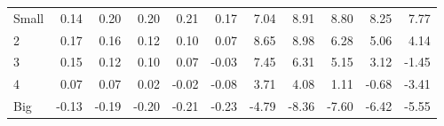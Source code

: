 \begin{table}[!ht]
\begin{tabular}{lrrrrrrrrrr}
    \\
      \cmidrule(r){2-6} \cmidrule(r){7-11}

    Small   & 0.14  & 0.20  & 0.20  & 0.21  & 0.17  & 7.04  & 8.91  & 8.80  & 8.25  & 7.77  \\
         2  & 0.17  & 0.16  & 0.12  & 0.10  & 0.07  & 8.65  & 8.98  & 6.28  & 5.06  & 4.14  \\
         3  & 0.15  & 0.12  & 0.10  & 0.07  & -0.03  & 7.45  & 6.31  & 5.15  & 3.12  & -1.45  \\
         4  & 0.07  & 0.07  & 0.02  & -0.02  & -0.08  & 3.71  & 4.08  & 1.11  & -0.68  & -3.41  \\
    Big     & -0.13  & -0.19  & -0.20  & -0.21  & -0.23  & -4.79  & -8.36  & -7.60  & -6.42  & -5.55  \\

  

  \bottomrule
\end{tabular}
\label{tbl:25_Size_Beta_C1997b}
\end{table}